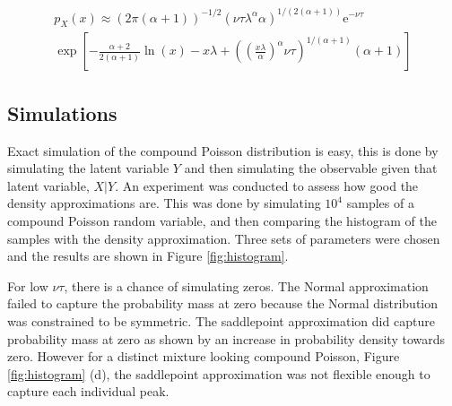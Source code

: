 \documentclass[a4paper]{proc}
\newcommand{\euler}{\mathrm{e}}
\begin{document}
\begin{figure*}[htb]
\begin{multline}
p_X(x)\approx
\left(2\pi(\alpha+1)\right)^{-1/2}\left(\nu\tau\lambda^\alpha\alpha\right)^{1/(2(\alpha+1))}\euler^{-\nu\tau}
\\
\exp\left[
-\frac{\alpha+2}{2(\alpha+1)}\ln(x)-x\lambda+\left(\left(\frac{x\lambda}{\alpha}\right)^{\alpha}\nu\tau\right)^{1/(\alpha+1)}(\alpha+1)
\right]
\label{eq:saddle_point_approx}
\end{multline}
\end{figure*}

\subsection{Simulations}
Exact simulation of the compound Poisson distribution is easy, this is done by simulating the latent variable $Y$ and then simulating the observable given that latent variable, $X|Y$. An experiment was conducted to assess how good the density approximations are. This was done by simulating $10^4$ samples of a compound Poisson random variable, and then comparing the histogram of the samples with the density approximation. Three sets of parameters were chosen and the results are shown in Figure \ref{fig:histogram}.

For low $\nu\tau$, there is a chance of simulating zeros. The Normal approximation failed to capture the probability mass at zero because the Normal distribution was constrained to be symmetric. The saddlepoint approximation did capture probability mass at zero as shown by an increase in probability density towards zero. However for a distinct mixture looking compound Poisson, Figure \ref{fig:histogram} (d), the saddlepoint approximation was not flexible enough to capture each individual peak.
\end{document}
